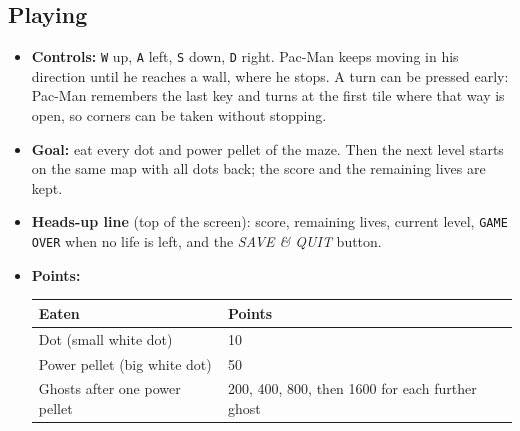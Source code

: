 \documentclass[11pt, a4paper]{article}
\begin{document}
\subsection*{Playing}
\begin{itemize}
    \item \textbf{Controls:} \texttt{W} up, \texttt{A} left, \texttt{S} down, \texttt{D} right. Pac-Man keeps moving in his direction until he reaches a wall, where he stops. A turn can be pressed early: Pac-Man remembers the last key and turns at the first tile where that way is open, so corners can be taken without stopping.
    \item \textbf{Goal:} eat every dot and power pellet of the maze. Then the next level starts on the same map with all dots back; the score and the remaining lives are kept.
    \item \textbf{Heads-up line} (top of the screen): score, remaining lives, current level, \texttt{GAME OVER} when no life is left, and the \textit{SAVE \& QUIT} button.
    \item \textbf{Points:}

    \vspace{0.1cm}
    \begin{tabular}{@{}ll@{}}
        \toprule
        \textbf{Eaten} & \textbf{Points} \\
        \midrule
        Dot (small white dot) & 10 \\
        Power pellet (big white dot) & 50 \\
        Ghosts after one power pellet & 200, 400, 800, then 1600 for each further ghost \\
        \bottomrule
    \end{tabular}
    \vspace{0.1cm}


\end{itemize}
\end{document}
